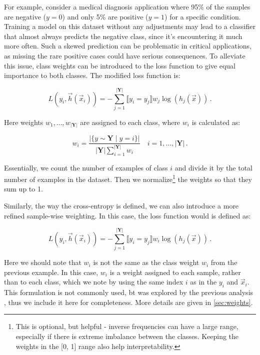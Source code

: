 For example, consider a medical diagnosis application where 95\% of the samples are negative ($y = 0$) and only 5\% are
positive ($y = 1$) for a specific condition. Training a model on this dataset without any adjustments may lead to a
classifier that almost always predicts the negative class, since it's encountering it much more often. Such a skewed
prediction can be problematic in critical applications, as missing the rare positive cases could have serious
consequences. To alleviate this issue, class weights can be introduced to the loss function to give equal importance to
both classes. The modified loss function is:

\begin{equation}
    L(y_i, \vec{h}(\vec{x}_i)) = -\sum_{j = 1}^{|\textbf{Y}|} \llbracket y_i = y_j \rrbracket w_j \log(h_j(\vec{x}))\,.
\end{equation}

Here weights $w_1, \dots, w_{|\textbf{Y}|}$ are assigned to each class, where $w_i$ is calculated as:

\begin{equation}
    w_i = \frac{|\{y \sim \textbf{Y} \mid y = i\}|}{|\textbf{Y}| \sum_{i = 1}^{|\textbf{Y}|} w_i} \quad i = 1, \dots, |\textbf{Y}|\,.
\end{equation}

Essentially, we count the number of examples of class $i$ and divide it by the total number of examples in the dataset.
Then we normalize\footnote{This is optional, but helpful - inverse frequencies can have a large range, especially if
    there is extreme imbalance between the classes. Keeping the weights in the [0, 1] range also help interpretability.}
the weights so that they sum up to 1.


Similarly, the way the cross-entropy is defined, we can also introduce a more refined sample-wise weighting. In this
case, the loss function would is defined as:

\begin{equation}
    L(y_i, \vec{h}(\vec{x}_i)) = -\sum_{j = 1}^{|\textbf{Y}|} \llbracket y_i = y_j \rrbracket w_i \log(h_j(\vec{x}))\,.
\end{equation}

Here we should note that $w_i$ is not the same as the class weight $w_i$ from the previous example. In this case, $w_i$
is a weight assigned to each sample, rather than to each class, which we note by using the same index $i$ as in the
$y_i$ and $\vec{x}_i$. This formulation is not commonly used, bt was explored by the previous analysis
\cite{severin,jan}, thus we include it here for completeness. More details are given in \autoref{sec:weights}.

